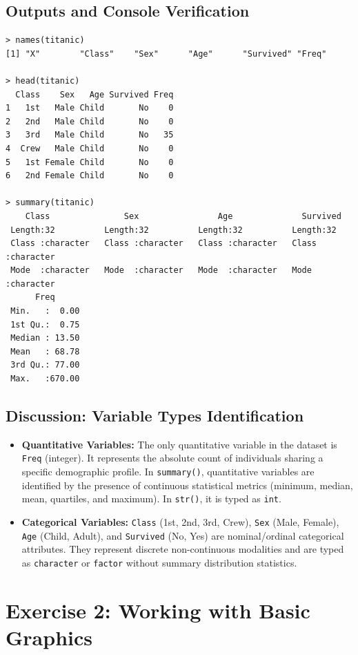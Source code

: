 \documentclass[11pt,a4paper]{article}
\begin{document}
\subsection{Outputs and Console Verification}
\begin{lstlisting}[language={}]
> names(titanic)
[1] "X"        "Class"    "Sex"      "Age"      "Survived" "Freq"    

> head(titanic)
  Class    Sex   Age Survived Freq
1   1st   Male Child       No    0
2   2nd   Male Child       No    0
3   3rd   Male Child       No   35
4  Crew   Male Child       No    0
5   1st Female Child       No    0
6   2nd Female Child       No    0

> summary(titanic)
    Class               Sex                Age              Survived        
 Length:32          Length:32          Length:32          Length:32         
 Class :character   Class :character   Class :character   Class :character  
 Mode  :character   Mode  :character   Mode  :character   Mode  :character  
      Freq       
 Min.   :  0.00  
 1st Qu.:  0.75  
 Median : 13.50  
 Mean   : 68.78  
 3rd Qu.: 77.00  
 Max.   :670.00  
\end{lstlisting}

\subsection{Discussion: Variable Types Identification}
\begin{itemize}
    \item \textbf{Quantitative Variables:} The only quantitative variable in the dataset is \texttt{Freq} (integer). It represents the absolute count of individuals sharing a specific demographic profile. In \texttt{summary()}, quantitative variables are identified by the presence of continuous statistical metrics (minimum, median, mean, quartiles, and maximum). In \texttt{str()}, it is typed as \texttt{int}.
    \item \textbf{Categorical Variables:} \texttt{Class} (1st, 2nd, 3rd, Crew), \texttt{Sex} (Male, Female), \texttt{Age} (Child, Adult), and \texttt{Survived} (No, Yes) are nominal/ordinal categorical attributes. They represent discrete non-continuous modalities and are typed as \texttt{character} or \texttt{factor} without summary distribution statistics.
\end{itemize}

\section{Exercise 2: Working with Basic Graphics}
\end{document}
